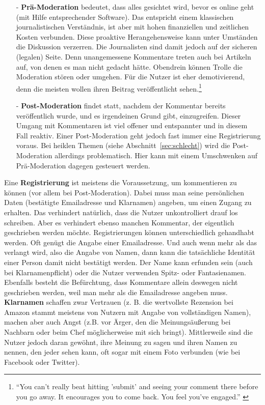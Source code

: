 \begin{itemize}
  \item[-] {\bfseries Prä-Moderation}
    bedeutet, dass alles gesichtet wird, bevor es online geht (mit Hilfe
    entsprechender Software). Das entspricht einem klassischen journalistischen
    Verständnis, ist aber mit hohen finanziellen und zeitlichen Kosten
    verbunden.  Diese \glqq proaktive\grqq{} Herangehensweise
    \autocite[S.~108]{reich} kann unter Umständen die Diskussion verzerren. Die
    Journalisten sind damit jedoch auf der sicheren (legalen) Seite. Denn
    unangemessene Kommentare treten auch bei Artikeln auf, von denen es man
    nicht gedacht hätte. Obendrein können \glqq Trolle\grqq{} die Moderation
    stören oder umgehen. Für die Nutzer ist eher demotivierend, denn die meisten
    wollen ihren Beitrag veröffentlicht sehen.\footnote{``You can't really beat
    hitting 'submit' and seeing your comment there before you go away. It
    encourages you to come back. You feel you've engaged.''
    \autocite[S.~109]{reich}}

  \item[-] {\bfseries Post-Moderation}
    findet statt, nachdem der Kommentar bereits veröffentlich wurde, und es
    irgendeinen Grund gibt, einzugreifen. Dieser Umgang mit Kommentaren ist viel
    offener und entspannter und in diesem Fall \glqq reaktiv\grqq. Einer
    Post-Moderation geht jedoch fast immer eine Registrierung voraus. Bei
    heiklen Themen (siehe Abschnitt~\ref{sec:schlecht})
    wird die Post-Moderation allerdings problematisch. Hier kann mit einem
    Umschwenken auf Prä-Moderation dagegen gesteuert werden.
\end{itemize}

Eine {\bfseries Registrierung} ist meistens die Voraussetzung, um kommentieren
zu können (vor allem bei Post-Moderation). Dabei muss man seine persönlichen
Daten (be\-stä\-tig\-te Emailadresse und Klarnamen) angeben, um einen Zugang zu
erhalten. Das verhindert natürlich, dass die Nutzer unkontrolliert drauf los
schreiben. Aber es verhindert ebenso manchen Kommentar, der eigentlich
geschrieben werden möchte. Registrierungen können unterschiedlich gehandhabt
werden. Oft genügt die Angabe einer Emailadresse. Und auch wenn mehr als das
verlangt wird, also die Angabe von Namen, dann kann die tatsächliche Identität
einer Person damit nicht bestätigt werden. Der Name kann erfunden sein (auch bei
Klarnamenpflicht) oder die Nutzer verwenden Spitz- oder Fantasienamen. Ebenfalls
besteht die Befürchtung, dass Kommentare allein deswegen nicht geschrieben
werden, weil man mehr als die Emailadresse angeben muss.  {\bfseries Klarnamen}
schaffen zwar Vertrauen (z. B. die wertvollste Rezension bei Amazon stammt
meistens von Nutzern mit Angabe von vollständigen Namen), machen aber auch Angst
(z.B. vor Ärger, den die Meinungsäußerung bei Nachbarn oder beim Chef
möglicherweise mit sich bringt). Mittlerweile sind die Nutzer jedoch daran
gewöhnt, ihre Meinung zu sagen und ihren Namen zu nennen, den jeder sehen kann,
oft sogar mit einem Foto verbunden (wie bei Facebook oder Twitter).


